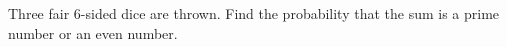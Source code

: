 Three fair $6$-sided dice are thrown. Find the probability that the sum is a prime number or an even number.
